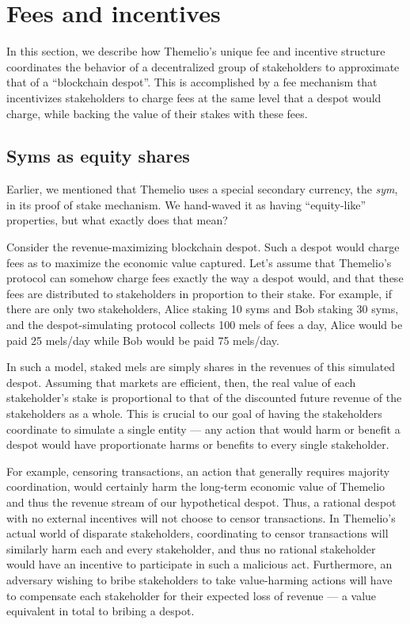 \documentclass[letterpaper,12pt,oneside]{article}
\begin{document}
\section{Fees and incentives} \label{sec:fees}

In this section, we describe how Themelio's unique fee and incentive structure coordinates the behavior of a decentralized group of stakeholders to approximate that of a ``blockchain despot''. This is accomplished by a fee mechanism that incentivizes stakeholders to charge fees at the same level that a despot would charge, while backing the value of their stakes with these fees.

\subsection{Syms as equity shares}

Earlier, we mentioned that Themelio uses a special secondary currency, the \emph{sym}, in its proof of stake mechanism. We hand-waved it as having ``equity-like'' properties, but what exactly does that mean?

Consider the revenue-maximizing blockchain despot. Such a despot would charge fees as to maximize the economic value captured. Let's assume that Themelio's protocol can somehow charge fees exactly the way a despot would, and that these fees are distributed to stakeholders in proportion to their stake. For example, if there are only two stakeholders, Alice staking 10 syms and Bob staking 30 syms, and the despot-simulating protocol collects 100 mels of fees a day, Alice would be paid 25 mels/day while Bob would be paid 75 mels/day.

In such a model, staked mels are simply shares in the revenues of this simulated despot. Assuming that markets are efficient, then, the real value of each stakeholder's stake is proportional to that of the discounted future revenue of the stakeholders as a whole. This is crucial to our goal of having the stakeholders coordinate to simulate a single entity --- any action that would harm or benefit a despot would have proportionate harms or benefits to every single stakeholder.

For example, censoring transactions, an action that generally requires majority coordination, would certainly harm the long-term economic value of Themelio and thus the revenue stream of our hypothetical despot. Thus, a rational despot with no external incentives will not choose to censor transactions. In Themelio's actual world of disparate stakeholders, coordinating to censor transactions will similarly harm each and every stakeholder, and thus no rational stakeholder would have an incentive to participate in such a malicious act. Furthermore, an adversary wishing to bribe stakeholders to take value-harming actions will have to compensate each stakeholder for their expected loss of revenue --- a value equivalent in total to bribing a despot.
\end{document}
